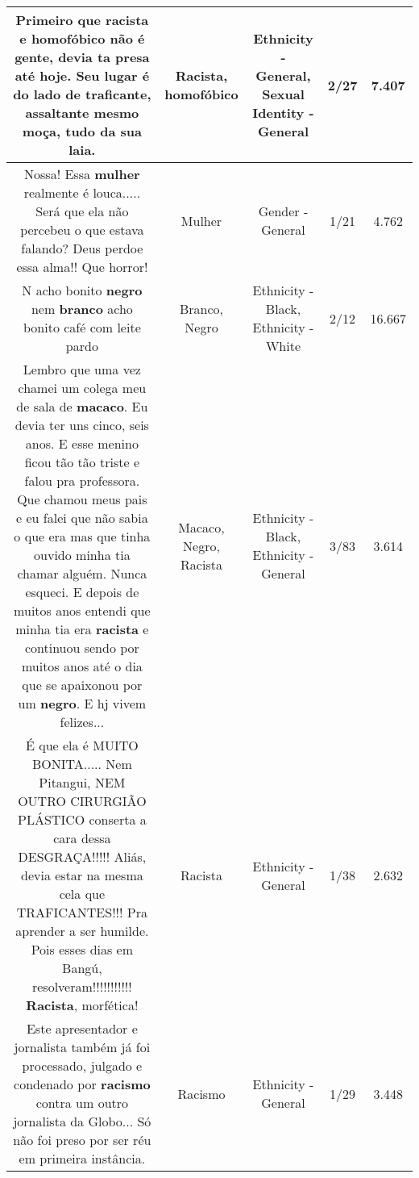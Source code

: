 \documentclass[11pt]{article}
\newlength\mylength
\begin{document}
\begin{center}
\begin{longtable}{|C{.65\mylength}|C{.30\mylength}|C{.12\mylength}|C{.12\mylength}|C{.12\mylength}|}
  \small Primeiro que \textbf{racista} e \textbf{homofóbico} não é gente, devia ta presa até hoje. Seu lugar é do lado de traficante, assaltante mesmo moça, tudo da sua laia.\normalsize   & Racista, homofóbico & Ethnicity - General, Sexual Identity - General & 2/27 & 7.407 \\  \hline
  \small Nossa! Essa \textbf{mulher} realmente é louca..... Será que ela não percebeu o que estava falando? Deus perdoe essa alma!! Que horror!\normalsize   & Mulher & Gender - General & 1/21 & 4.762 \\  \hline
  \small N acho bonito \textbf{negro} nem \textbf{branco} acho bonito café com leite pardo\normalsize   & Branco, Negro & Ethnicity - Black, Ethnicity - White & 2/12 & 16.667 \\  \hline
  \small Lembro que uma vez chamei um colega meu de sala de \textbf{macaco}. Eu devia ter uns cinco, seis anos. E esse menino ficou tão tão triste e falou pra professora. Que chamou meus pais e eu falei que não sabia o que era mas que tinha ouvido minha tia chamar alguém. Nunca esqueci. E depois de muitos anos entendi que minha tia era \textbf{racista} e continuou sendo por muitos anos até o dia que se apaixonou por um \textbf{negro}. E hj vivem felizes...\normalsize   & Macaco, Negro, Racista & Ethnicity - Black, Ethnicity - General & 3/83 & 3.614 \\  \hline
  \small É que ela é MUITO BONITA..... Nem Pitangui, NEM OUTRO CIRURGIÃO PLÁSTICO conserta a cara dessa DESGRAÇA!!!!! Aliás, devia estar na mesma cela que TRAFICANTES!!! Pra aprender a ser humilde. Pois esses dias em Bangú, resolveram!!!!!!!!!!! \textbf{Racista}, morfética!\normalsize   & Racista & Ethnicity - General & 1/38 & 2.632 \\  \hline
  \small Este apresentador e jornalista também já foi processado, julgado e condenado por \textbf{racismo} contra um outro jornalista da Globo... Só não foi preso por ser réu em primeira instância.\normalsize   & Racismo & Ethnicity - General & 1/29 & 3.448 \\  \hline

\end{longtable}
\end{center}
\end{document}

